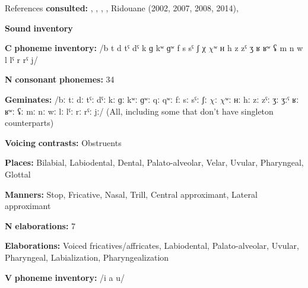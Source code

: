 \documentclass[output=paper]{langsci/langscibook}
\begin{document}
\begin{styleBody}
References \textbf{consulted:} \citet{Coleman2001}, \citet{DellElmedlaoui2002}, \citet{GordonNafi2012}, \citet{LoualiPuech1999}, Ridouane (2002, 2007, 2008, 2014), \citet{RoettgerEtAl2015}
\end{styleBody}

\begin{styleBody}
\textbf{Sound} \textbf{inventory}
\end{styleBody}

\begin{styleBody}
\textbf{C} \textbf{phoneme} \textbf{inventory:} /b t d tˤ dˤ k ɡ kʷ ɡʷ f s sˤ ʃ χ $\chi ʷ$ ʜ h z zˤ ʒ ʁ ʁʷ ʢ m n w l lˤ r rˤ j/
\end{styleBody}

\begin{styleBody}
\textbf{N} \textbf{consonant} \textbf{phonemes:} 34
\end{styleBody}

\begin{styleBody}
\textbf{Geminates:} /bː tː dː tˤː dˤː kː ɡː kʷː ɡʷː qː qʷː fː sː sˤː ʃː $\chi ː$ $\chi ʷː$ ʜː hː zː zˤː ʒː ʒːˤ ʁː ʁʷː ʢː mː nː wː lː lˤː rː rˤː jː/ (All, including some that don’t have singleton counterparts)
\end{styleBody}

\begin{styleBody}
\textbf{Voicing} \textbf{contrasts:} Obstruents
\end{styleBody}

\begin{styleBody}
\textbf{Places:} Bilabial, Labiodental, Dental, Palato-alveolar, Velar, Uvular, Pharyngeal, Glottal
\end{styleBody}

\begin{styleBody}
\textbf{Manners:} Stop, Fricative, Nasal, Trill, Central approximant, Lateral approximant
\end{styleBody}

\begin{styleBody}
\textbf{N} \textbf{elaborations:} 7
\end{styleBody}

\begin{styleBody}
\textbf{Elaborations:} Voiced fricatives/affricates, Labiodental, Palato-alveolar, Uvular, Pharyngeal, Labialization, Pharyngealization
\end{styleBody}

\begin{styleBody}
\textbf{V} \textbf{phoneme} \textbf{inventory:} /i a u/
\end{styleBody}
\end{document}
